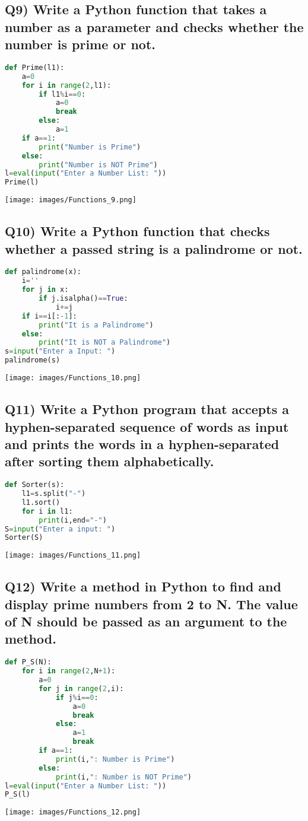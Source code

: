 \documentclass{article}
\begin{document}
\subsection*{Q9) Write a Python function that takes a number as a parameter and checks whether the number is prime or not.}
\begin{lstlisting}[language=Python]
def Prime(l1):
    a=0
    for i in range(2,l1):
        if l1%i==0:
            a=0
            break
        else:
            a=1
    if a==1:
        print("Number is Prime")
    else:
        print("Number is NOT Prime")
l=eval(input("Enter a Number List: "))
Prime(l)
\end{lstlisting}
\texttt{[image: images/Functions\_9.png]}

\subsection*{Q10) Write a Python function that checks whether a passed string is a palindrome or not.}
\begin{lstlisting}[language=Python]
def palindrome(x):
    i=''
    for j in x:
        if j.isalpha()==True:
            i+=j
    if i==i[:-1]:
        print("It is a Palindrome")
    else:
        print("It is NOT a Palindrome")
s=input("Enter a Input: ")
palindrome(s)
\end{lstlisting}
\texttt{[image: images/Functions\_10.png]}

\subsection*{Q11) Write a Python program that accepts a hyphen-separated sequence of words as input and prints the words in a hyphen-separated after sorting them alphabetically.}
\begin{lstlisting}[language=Python]
def Sorter(s):
    l1=s.split("-")
    l1.sort()
    for i in l1:
        print(i,end="-")
S=input("Enter a input: ")
Sorter(S)
\end{lstlisting}
\texttt{[image: images/Functions\_11.png]}

\subsection*{Q12) Write a method in Python to find and display prime numbers from 2 to N. The value of N should be passed as an argument to the method.}
\begin{lstlisting}[language=Python]
def P_S(N):
    for i in range(2,N+1):
        a=0
        for j in range(2,i):
            if j%i==0:
                a=0
                break
            else:
                a=1
                break
        if a==1:
            print(i,": Number is Prime")
        else:
            print(i,": Number is NOT Prime")
l=eval(input("Enter a Number List: "))
P_S(l)
\end{lstlisting}
\texttt{[image: images/Functions\_12.png]}
\end{document}
